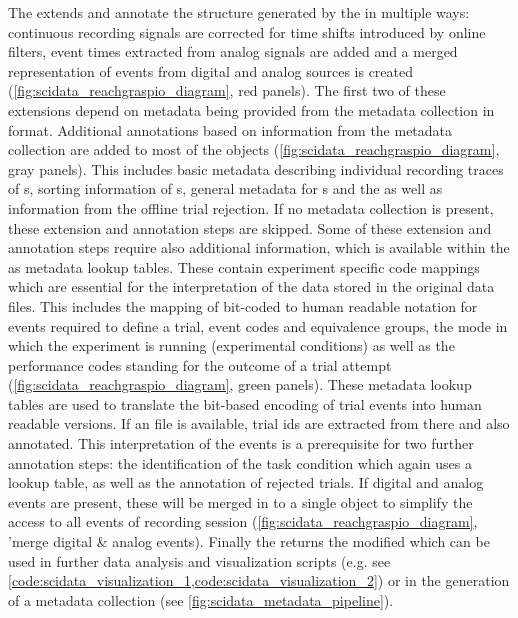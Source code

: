 The  extends and annotate the  structure generated by the  in multiple ways: continuous recording signals are corrected for time shifts introduced by online filters, event times extracted from analog signals are added and a merged representation of events from digital and analog sources is created (\cref{fig:scidata_reachgraspio_diagram}, red panels). The first two of these extensions depend on metadata being provided from the metadata collection in  format. Additional annotations based on information from the metadata collection are added to most of the  objects (\cref{fig:scidata_reachgraspio_diagram}, gray panels). This includes basic metadata describing individual recording traces of s, sorting information of s, general metadata for s and the   as well as information from the offline trial rejection. If no metadata collection is present, these extension and annotation steps are skipped. Some of these extension and annotation steps require also additional information, which is available within the  as metadata lookup tables. These contain experiment specific code mappings which are essential for the interpretation of the data stored in the original  data files. This includes the mapping of bit-coded to human readable notation for events required to define a trial, event codes and equivalence groups, the mode in which the experiment is running (experimental conditions) as well as the performance codes standing for the outcome of a trial attempt (\cref{fig:scidata_reachgraspio_diagram}, green panels). These metadata lookup tables are used to translate the bit-based encoding of trial events into human readable versions. If an  file is available, trial ids are extracted from there and also annotated. This interpretation of the events is a prerequisite for two further annotation steps: the identification of the task condition which again uses a  lookup table, as well as the annotation of rejected trials. If digital and analog events are present, these will be merged in to a single  object to simplify the access to all events of recording session (\cref{fig:scidata_reachgraspio_diagram}, 'merge digital \& analog events). Finally the  returns the modified   which can be used in further data analysis and visualization scripts (e.g. see \ref{code:scidata_visualization_1,code:scidata_visualization_2}) or in the generation of a metadata collection (see \ref{fig:scidata_metadata_pipeline}).

